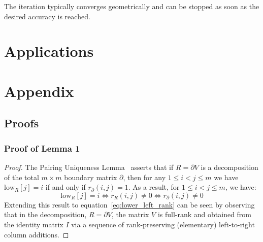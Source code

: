 \documentclass[10pt]{article}
\newcommand{\+}{%
	\raisebox{0.18ex}{\scaleobj{0.55}{+}}
}
\begin{document}
The iteration typically converges geometrically and can be stopped as soon as the desired accuracy is reached.

%

\section{Applications}\label{sec:applications}

\newpage 
%



\appendix
\section{Appendix}

\subsection{Proofs}
\subsubsection*{Proof of Lemma 1}
\begin{proof}
	The Pairing Uniqueness Lemma~\cite{dey2022computational} asserts that if $R = \partial V$ is a decomposition of the total $m \times m$ boundary matrix $\partial$, then for any $1 \leq i < j \leq m$ we have $\mathrm{low}_R[j] = i$ if and only if $r_\partial(i,j) = 1$. 
	As a result, for $1 \leq i < j \leq m$, we have:
\begin{equation}
	\mathrm{low}_R[j] = i \iff r_R(i,j) \neq 0 \iff r_\partial(i,j) \neq 0
\end{equation} 
Extending this result to equation~\eqref{eq:lower_left_rank} can be seen by observing that in the decomposition, $R = \partial V$, the matrix $V$ is full-rank and obtained from the identity matrix $I$ via a sequence of rank-preserving (elementary) left-to-right column additions.  
\end{proof}
\end{document}
